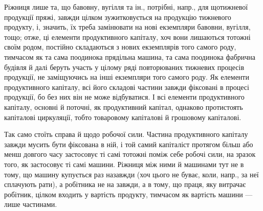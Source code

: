 Ріжниця лише та, що бавовну, вугілля та ін., потрібні, напр., для
щотижневої продукції пряжі, завжди цілком зужитковується на продукцію
тижневого продукту, і, значить, їх треба замінювати на нові екземпляри
бавовни, вугілля, тощо; отже, ці елементи продуктивного капіталу,
хоч вони лишаються тотожні своїм родом, постійно складаються з нових
екземплярів того самого роду, тимчасом як та сама поодинока прядільна
машина, та сама поодинока фабрична будівля й далі беруть участь
у цілому ряді повторюваних тижневих процесів продукції, не заміщуючись
на інші екземпляри того самого роду. Як елементи продуктивного
капіталу, всі його складові частини завжди фіксовані в процесі
продукції, бо без них він не може відбуватися. І всі елементи продуктивного
капіталу, основні й поточні, як продуктивний капітал, однаково
протистоять капіталові циркуляції, тобто товаровому капіталові й грошовому
капіталові.

Так само стоїть справа й щодо робочої сили. Частина продуктивного
капіталу завжди мусить бути фіксована в ній, і той самий капіталіст
протягом більш або менш довгого часу застосовує ті самі тотожні
поміж себе робочі сили, на зразок того, як застосовує ті самі машини.
Ріжниця між ними й машинами тут не в тому, що машину купується раз
назавжди (хоч цього не буває, коли, напр., за неї сплачують рати), а
робітника не на завжди, а в тому, що праця, яку витрачає робітник,
цілком входить у вартість продукту, тимчасом як вартість машини — лише
частинами.

